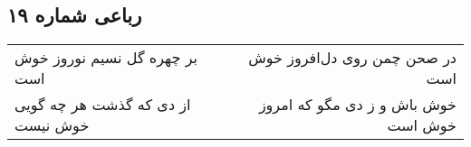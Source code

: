 \begin{center}
\section*{رباعی شماره ۱۹}
\label{sec:sh019}
\begin{longtable}{l p{0.5cm} r}
بر چهره گل نسیم نوروز خوش است
&&
در صحن چمن روی دل‌افروز خوش است
\\
از دی که گذشت هر چه گویی خوش نیست
&&
خوش باش و ز دی مگو که امروز خوش است
\\
\end{longtable}
\end{center}
